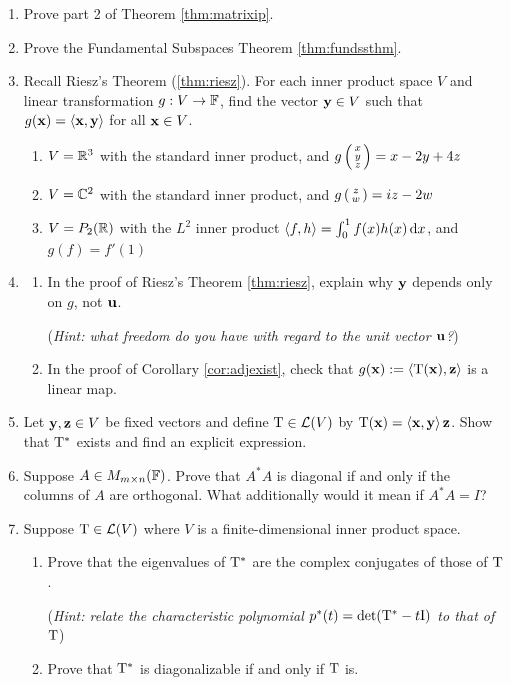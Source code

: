 \begin{exercises}
\begin{enumerate}
	
		\item Prove part 2 of Theorem \ref{thm:matrixip}.
	
	
	  \item\label{exs:fundssthm} Prove the Fundamental Subspaces Theorem \ref{thm:fundssthm}.
	  
	  
	  \item Recall Riesz's Theorem (\ref{thm:riesz}). For each inner product space $V$ and linear transformation $g:V\to\mathbb{F}$, find the vector ${\mathbf{y}}\in V$ such that $g({\mathbf{x}})=\left\langle {\mathbf{x}},{\mathbf{y}}\right\rangle$ for all ${\mathbf{x}}\in V$.
	  \begin{enumerate}
	    \item $V=\mathbb{R}^3$ with the standard inner product, and $g\left(\begin{smallmatrix}x\\y\\z\end{smallmatrix}\right)=x-2y+4z$
	    \item $V=\mathbb{C}^2$ with the standard inner product, and $g\left(\begin{smallmatrix}z\\w\end{smallmatrix}\right)=iz-2w$
	    \item $V=P_2(\mathbb{R})$ with the $L^2$ inner product $\left\langle f,h\right\rangle=\int_0^1 f(x)h(x)\,{\mathrm{d} x}$, and $g(f)=f'(1)$
	  \end{enumerate}
		
	  
	  \item\begin{enumerate}
	    \item In the proof of Riesz's Theorem \ref{thm:riesz}, explain why ${\mathbf{y}}$ depends only on $g$, not ${\mathbf{u}}$.\par
	    (\emph{Hint: what freedom do you have with regard to the unit vector ${\mathbf{u}}$?})
	    \item In the proof of Corollary \ref{cor:adjexist}, check that $g({\mathbf{x}}):=\left\langle \mathrm{T}({\mathbf{x}}),{\mathbf{z}}\right\rangle$ is a linear map.
	  \end{enumerate}
	  
	  
	  \item Let ${\mathbf{y}},{\mathbf{z}}\in V$ be fixed vectors and define $\mathrm{T}\in\mathcal{L}(V)$ by $\mathrm{T}({\mathbf{x}})=\left\langle {\mathbf{x}},{\mathbf{y}}\right\rangle{\mathbf{z}}$. Show that $\mathrm{T}^*$ exists and find an explicit expression.
	  
	  
	  \item Suppose $A\in M_{m\times n}(\mathbb{F})$. Prove that $A^*A$ is diagonal if and only if the columns of $A$ are orthogonal. What additionally would it mean if $A^*A=I$?
	  
	  
	 	\item Suppose $\mathrm{T}\in\mathcal{L}(V)$ where $V$ is a finite-dimensional inner product space.
	 	\begin{enumerate}
	 	  \item Prove that the eigenvalues of $\mathrm{T}^*$ are the complex conjugates of those of $\mathrm{T}$.\par
	 	  (\emph{Hint: relate the characteristic polynomial $p^*(t)=\det(\mathrm{T}^*-t\mathrm{I})$ to that of $\mathrm{T}$})
	 	  \item Prove that $\mathrm{T}^*$ is diagonalizable if and only if $\mathrm{T}$ is.
	 	\end{enumerate}
	

\end{enumerate}
\end{exercises}
